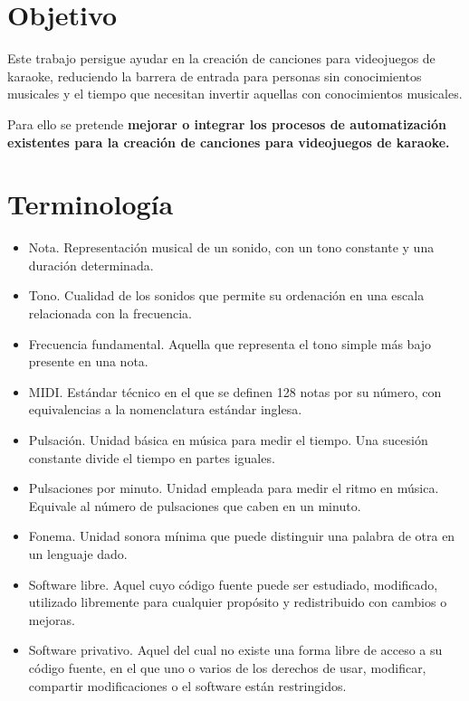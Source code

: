 \section{Objetivo}

Este trabajo persigue ayudar en la creación de canciones para videojuegos de karaoke, reduciendo la barrera de entrada para personas sin conocimientos musicales y el tiempo que necesitan invertir aquellas con conocimientos musicales.


Para ello se pretende \textbf{mejorar o integrar los procesos de automatización existentes para la creación de canciones para videojuegos de karaoke.}

\section{Terminología}

\begin{itemize}
	\item{Nota. Representación musical de un sonido, con un tono constante y una duración determinada.}
	\item{Tono. Cualidad de los sonidos que permite su ordenación en una escala relacionada con la frecuencia.}
	\item{Frecuencia fundamental. Aquella que representa el tono simple más bajo presente en una nota.}
	\item{MIDI. Estándar técnico en el que se definen 128 notas por su número, con equivalencias a la nomenclatura estándar inglesa.}
	\item{Pulsación. Unidad básica en música para medir el tiempo. Una sucesión constante divide el tiempo en partes iguales.}
	\item{Pulsaciones por minuto. Unidad empleada para medir el ritmo en música. Equivale al número de pulsaciones que caben en un minuto.}
	\item{Fonema. Unidad sonora mínima que puede distinguir una palabra de otra en un lenguaje dado.}
	\item{Software libre. Aquel cuyo código fuente puede ser estudiado, modificado, utilizado libremente para cualquier propósito y redistribuido con cambios o mejoras.}
	\item{Software privativo. Aquel del cual no existe una forma libre de acceso a su código fuente, en el que uno o varios de los derechos de usar, modificar, compartir modificaciones o el software están restringidos.}
\end{itemize}